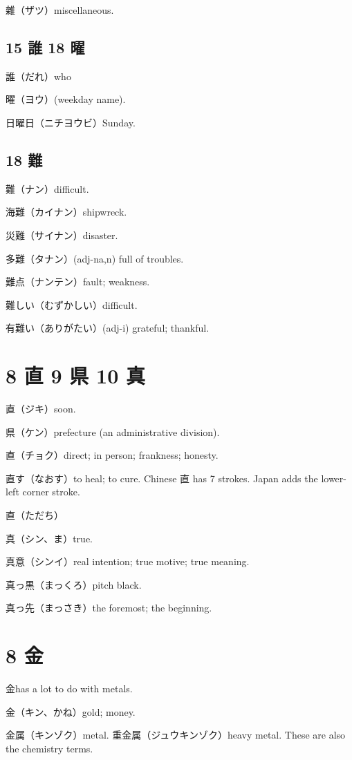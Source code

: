 雜（ザツ）miscellaneous.

\subsection{15 誰 18 曜}

誰（だれ）who

曜（ヨウ）(weekday name).

日曜日（ニチヨウビ）Sunday.

\subsection{18 難}

難（ナン）difficult.

海難（カイナン）shipwreck.

災難（サイナン）disaster.

多難（タナン）(adj-na,n) full of troubles.

難点（ナンテン）fault; weakness.

難しい（むずかしい）difficult.

有難い（ありがたい）(adj-i) grateful; thankful.

\section{8 直 9 県 10 真}

直（ジキ）soon.

県（ケン）prefecture (an administrative division).

直（チョク）direct; in person; frankness; honesty.

直す（なおす）to heal; to cure.
Chinese 直 has 7 strokes.
Japan adds the lower-left corner stroke.

直（ただち）

真（シン、ま）true.

真意（シンイ）real intention; true motive; true meaning.

真っ黒（まっくろ）pitch black.

真っ先（まっさき）the foremost; the beginning.

\section{8 金}

金has a lot to do with metals.

金（キン、かね）gold; money.

金属（キンゾク）metal.
重金属（ジュウキンゾク）heavy metal.
These are also the chemistry terms.

